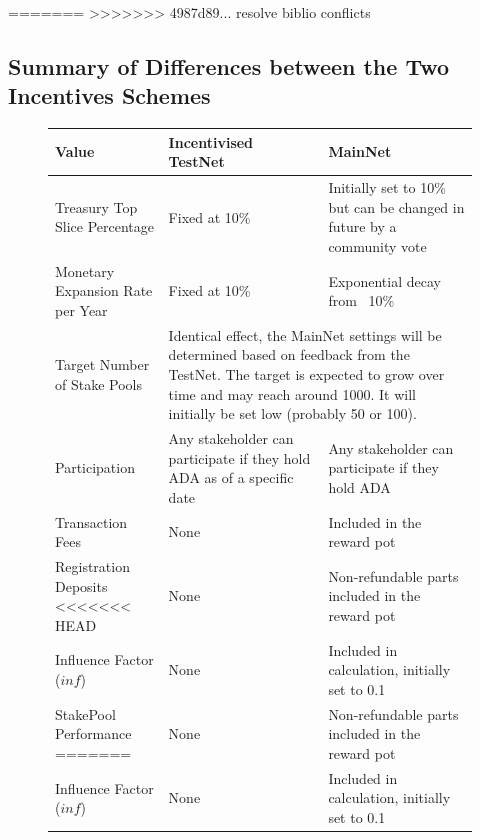 \documentclass[11pt,a4paper,dvipsnames,twosided,final]{article}
\begin{document}
=======
>>>>>>> 4987d89... resolve biblio conflicts
\clearpage
\subsection{Summary of Differences between the Two Incentives Schemes}
\label{sec:summary}

\begin{figure}[h!]
\begin{center}
\begin{tabular}{||l|p{4cm}|p{4cm}||}
  \hline\hline
  \textbf{Value} & \textbf{Incentivised TestNet} & \textbf{MainNet}
                                              \\\hline
Treasury Top Slice Percentage
& Fixed at 10\%
& Initially set to 10\% but can be changed in future by a community vote
                                              \\\hline
Monetary Expansion Rate per Year
& Fixed at 10\%
& Exponential decay from ~10\%
                                              \\\hline
 Target Number of Stake Pools
                 &
\multicolumn{2}{|p{8cm}||}{
Identical effect, the MainNet settings will be determined based on feedback from the TestNet.
The target is expected to grow over time and may reach around 1000.
It will initially be set low (probably 50 or 100).}
                                              \\\hline
Participation
& Any stakeholder can participate if they hold ADA as of a specific date
& Any stakeholder can participate if they hold ADA
                                              \\\hline
Transaction Fees
& None
& Included in the reward pot
                                              \\\hline
Registration Deposits
<<<<<<< HEAD
& None
& Non-refundable parts included in the reward pot
                                              \\\hline
Influence Factor ($\textit{inf}$)
& None
& Included in calculation, initially set to 0.1
                                              \\\hline
StakePool Performance
=======
& None
& Non-refundable parts included in the reward pot
                                              \\\hline
Influence Factor ($\textit{inf}$)
& None
& Included in calculation, initially set to 0.1
                                              \\\hline

\end{tabular}
\end{center}
\end{figure}
\end{document}
